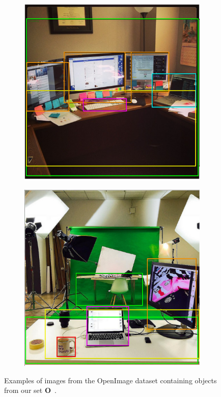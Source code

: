 \documentclass[a4paper, twoside]{article}
\begin{document}
\begin{figure}
  \centering
  \begin{subfigure}
    \centering
    \includegraphics[width=\columnwidth]{figures/desk_example.png}
  \end{subfigure}
  \vfill
  \begin{subfigure}
    \centering
    \includegraphics[width=\columnwidth]{figures/mug_example.png}
  \end{subfigure}
  \caption{Examples of images from the OpenImage dataset containing objects from our set $\mathbf{O}$~\cite{openimages}. }\label{fig:openimage-example}
\end{figure}
\end{document}
